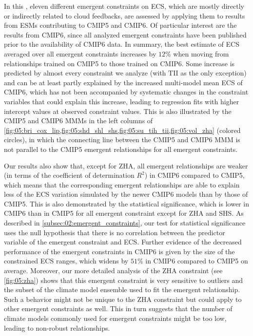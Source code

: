 In this , eleven different emergent constraints on
\ac{ECS}, which are mostly directly or indirectly related to cloud feedbacks,
are assessed by applying them to results from \acp{ESM} contributing to
\acs{CMIP}5 and \acs{CMIP}6. Of particular interest are the results from
\acs{CMIP}6, since all analyzed emergent constraints have been published prior
to the availability of \acs{CMIP}6 data. In summary, the best estimate of
\ac{ECS} averaged over all emergent constraints increases by $12 \unit{\%}$
when moving from relationships trained on \acs{CMIP}5 to those trained on
\acs{CMIP}6. Some increase is predicted by almost every constraint we analyze
(with TII as the only exception) and can be at least partly explained by the
increased multi-model mean \ac{ECS} of \acs{CMIP}6, which has not been
accompanied by systematic changes in the constraint variables that could
explain this increase, leading to regression fits with higher intercept values
at observed constraint values. This is also illustrated by the \acs{CMIP}5 and
\acs{CMIP}6 \acp{MMM} in the left columns of
\cref{fig:05:bri_cox_lip,fig:05:shd_shl_shs,fig:05:su_tih_tii,fig:05:vol_zha}
(colored circles), in which the connecting line between the \acs{CMIP}5 and
\acs{CMIP}6 \ac{MMM} is not parallel to the \acs{CMIP}5 emergent relationships
for all emergent constraints.

Our results also show that, except for ZHA, all emergent relationships are
weaker (in terms of the coefficient of determination $R^2$) in \acs{CMIP}6
compared to \acs{CMIP}5, which means that the corresponding emergent
relationships are able to explain less of the \ac{ECS} variation simulated by
the newer \acs{CMIP}6 models than by those of \acs{CMIP}5. This is also
demonstrated by the statistical significance, which is lower in \acs{CMIP}6
than in \acs{CMIP}5 for all emergent constraint except for ZHA and SHS. As
described in \cref{subsec:02:emergent_constraints}, our test for statistical
significance uses the null hypothesis that there is no correlation between the
predictor variable of the emergent constraint and \ac{ECS}. Further evidence of
the decreased performance of the emergent constraints in \acs{CMIP}6 is given
by the size of the constrained \acs{ECS} ranges, which widens by $51 \unit{\%}$
in \acs{CMIP}6 compared to \acs{CMIP}5 on average. Moreover, our more detailed
analysis of the ZHA constraint (see \cref{fig:05:zha}) shows that this emergent
constraint is very sensitive to outliers and the subset of the climate model
ensemble used to fit the emergent relationship. Such a behavior might not be
unique to the ZHA constraint but could apply to other emergent constraints as
well. This in turn suggests that the number of climate models commonly used for
emergent constraints might be too low, leading to non-robust relationships.

